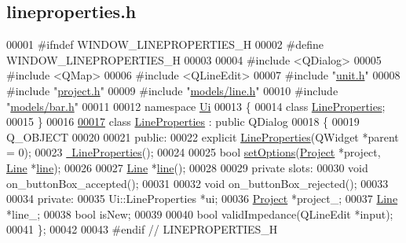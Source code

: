 \hypertarget{lineproperties_8h_source}{}\subsection{lineproperties.\+h}
\label{lineproperties_8h_source}

\begin{DoxyCode}
00001 \textcolor{preprocessor}{#ifndef WINDOW\_LINEPROPERTIES\_H}
00002 \textcolor{preprocessor}{#define WINDOW\_LINEPROPERTIES\_H}
00003 
00004 \textcolor{preprocessor}{#include <QDialog>}
00005 \textcolor{preprocessor}{#include <QMap>}
00006 \textcolor{preprocessor}{#include <QLineEdit>}
00007 \textcolor{preprocessor}{#include "\hyperlink{unit_8h}{unit.h}"}
00008 \textcolor{preprocessor}{#include "\hyperlink{project_8h}{project.h}"}
00009 \textcolor{preprocessor}{#include "\hyperlink{line_8h}{models/line.h}"}
00010 \textcolor{preprocessor}{#include "\hyperlink{bar_8h}{models/bar.h}"}
00011 
00012 \textcolor{keyword}{namespace }\hyperlink{namespace_ui}{Ui}
00013 \{
00014 \textcolor{keyword}{class }\hyperlink{class_line_properties}{LineProperties};
00015 \}
00016 
\hypertarget{lineproperties_8h_source_l00017}{}\hyperlink{class_line_properties}{00017} \textcolor{keyword}{class }\hyperlink{class_line_properties}{LineProperties} : \textcolor{keyword}{public} QDialog
00018 \{
00019   Q\_OBJECT
00020 
00021 \textcolor{keyword}{public}:
00022   \textcolor{keyword}{explicit} \hyperlink{class_line_properties_a0bc0d7c02db0a4ea920d040f76679fec}{LineProperties}(QWidget *parent = 0);
00023   \hyperlink{class_line_properties_a59017a6580f2e02dc492522d9267de29}{~LineProperties}();
00024 
00025   \textcolor{keywordtype}{bool} \hyperlink{class_line_properties_ac14e88843b60ac7130a11c057306379a}{setOptions}(\hyperlink{class_project}{Project} *project, \hyperlink{class_line}{Line} *\hyperlink{class_line_properties_ae99691d680b4df7bac3419b5588bd777}{line});
00026 
00027   \hyperlink{class_line}{Line} *\hyperlink{class_line_properties_ae99691d680b4df7bac3419b5588bd777}{line}();
00028 
00029 \textcolor{keyword}{private} slots:
00030   \textcolor{keywordtype}{void} on\_buttonBox\_accepted();
00031 
00032   \textcolor{keywordtype}{void} on\_buttonBox\_rejected();
00033 
00034 \textcolor{keyword}{private}:
00035   Ui::LineProperties *ui;
00036   \hyperlink{class_project}{Project} *project\_;
00037   \hyperlink{class_line}{Line} *line\_;
00038   \textcolor{keywordtype}{bool} isNew;
00039 
00040   \textcolor{keywordtype}{bool} validImpedance(QLineEdit *input);
00041 \};
00042 
00043 \textcolor{preprocessor}{#endif // LINEPROPERTIES\_H}
\end{DoxyCode}
